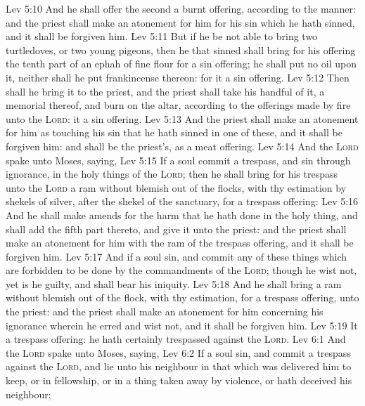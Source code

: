 \vs Lev 5:10 And he shall offer the second  a burnt offering, according to the manner: and the priest shall make an atonement for him for his sin which he hath sinned, and it shall be forgiven him.
\vs Lev 5:11 But if he be not able to bring two turtledoves, or two young pigeons, then he that sinned shall bring for his offering the tenth part of an ephah of fine flour for a sin offering; he shall put no oil upon it, neither shall he put  frankincense thereon: for it  a sin offering.
\vs Lev 5:12 Then shall he bring it to the priest, and the priest shall take his handful of it,  a memorial thereof, and burn  on the altar, according to the offerings made by fire unto the \textsc{Lord}: it  a sin offering.
\vs Lev 5:13 And the priest shall make an atonement for him as touching his sin that he hath sinned in one of these, and it shall be forgiven him: and  shall be the priest's, as a meat offering.
\vs Lev 5:14 And the \textsc{Lord} spake unto Moses, saying,
\vs Lev 5:15 If a soul commit a trespass, and sin through ignorance, in the holy things of the \textsc{Lord}; then he shall bring for his trespass unto the \textsc{Lord} a ram without blemish out of the flocks, with thy estimation by shekels of silver, after the shekel of the sanctuary, for a trespass offering:
\vs Lev 5:16 And he shall make amends for the harm that he hath done in the holy thing, and shall add the fifth part thereto, and give it unto the priest: and the priest shall make an atonement for him with the ram of the trespass offering, and it shall be forgiven him.
\vs Lev 5:17 And if a soul sin, and commit any of these things which are forbidden to be done by the commandments of the \textsc{Lord}; though he wist  not, yet is he guilty, and shall bear his iniquity.
\vs Lev 5:18 And he shall bring a ram without blemish out of the flock, with thy estimation, for a trespass offering, unto the priest: and the priest shall make an atonement for him concerning his ignorance wherein he erred and wist  not, and it shall be forgiven him.
\vs Lev 5:19 It  a trespass offering: he hath certainly trespassed against the \textsc{Lord}.
\vs Lev 6:1 And the \textsc{Lord} spake unto Moses, saying,
\vs Lev 6:2 If a soul sin, and commit a trespass against the \textsc{Lord}, and lie unto his neighbour in that which was delivered him to keep, or in fellowship, or in a thing taken away by violence, or hath deceived his neighbour;
